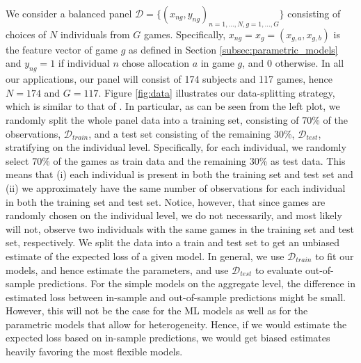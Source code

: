 \documentclass[11pt,a4paper]{article}
\theoremstyle{definition}
\begin{document}
We consider a balanced panel \(\mathcal{D}=\{(x_{ng},y_{ng})_{n=1,\dots,N,g=1,\dots,G}\}\) consisting of choices of \(N\) individuals from \(G\) games. Specifically, \(x_{ng}=x_g = (x_{g,a},x_{g,b})\) is the feature vector of game \(g\) as defined in Section \ref{subsec:parametric_models} and \(y_{ng}=1\) if individual \(n\) chose allocation \(a\) in game \(g\), and 0 otherwise. In all our applications, our panel will consist of 174 subjects and 117 games, hence \(N=174\) and \(G=117\). Figure \ref{fig:data} illustrates our data-splitting strategy, which is similar to that of \cite{Peysakhovich2017}. In particular,  as can be seen from the left plot, we randomly split the whole panel data into a training set, consisting of 70\% of the observations,  \(\mathcal{D}_{train}\), and a test set consisting of the remaining 30\%, \(\mathcal{D}_{test}\), stratifying on the individual level. Specifically, for each individual, we randomly select 70\% of the games as train data and the remaining 30\% as test data. This means that (i) each individual is present in both the training set and test set and (ii) we approximately have the same number of observations for each individual in both the training set and test set. Notice, however, that since games are randomly chosen on the individual level, we do not necessarily, and most likely will not, observe two individuals with the same games in the training set and test set, respectively. We split the data into a train and test set to get an unbiased estimate of the expected loss of a given model. In general, we use \(\mathcal{D}_{train}\) to fit our models, and hence estimate the parameters, and use \(\mathcal{D}_{test}\) to evaluate out-of-sample predictions. For the simple models on the aggregate level, the difference in estimated loss between in-sample and out-of-sample predictions might be small. However, this will not be the case for the ML models as well as for the parametric models that allow for heterogeneity. Hence, if we would estimate the expected loss based on in-sample predictions, we would get biased estimates heavily favoring the most flexible models.
\end{document}
